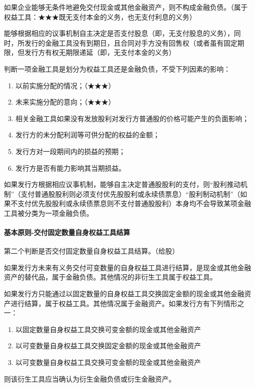 \documentclass[UTF8,12pt]{ctexart}
\numberwithin{equation}{section} %
\numberwithin{figure}{section}
\numberwithin{table}{section}
\begin{document}
	如果企业能够无条件地避免交付现金或其他金融资产，则不构成金融负债。（属于权益工具：★★★既无支付本金的义务，也无支付利息的义务）
	
	能够根据相应的议事机制自主决定是否支付股息（即，无支付股息的义务），同时，所发行的金融工具没有到期日，且合同对手方没有回售权（或者虽有固定期限，但发行方有权无期限递延（即，无支付本金的义务）
	
	判断一项金融工具是划分为权益工具还是金融负债，不受下列因素的影响：
	\begin{enumerate}
		\item 以前实施分配的情况；（★★★）
		
		\item 未来实施分配的意向；（★★★）
		
		\item 相关金融工具如果没有发放股利对发行方普通股的价格可能产生的负面影响；
		
		\item 发行方的未分配利润等可供分配的权益的金额；
		
		\item 发行方对一段期间内的损益的预期；
		
		\item 发行方是否有能力影响其当期损益。
	\end{enumerate}
	
	如果发行方根据相应议事机制，能够自主决定普通股股利的支付，则“股利推动机制”（支付普通股股利则必须支付优先股股利或永续债票息）“股利制动机制”（如果不支付优先股股利或永续债票息则不支付普通股股利）本身均不会导致某项金融工具被分类为一项金融负债。
	
	\paragraph{基本原则-交付固定数量自身权益工具结算}
	第二个判断是否交付固定数量自身权益工具结算。（给股）
	
	如果发行方未来有义务交付可变数量的自身权益工具进行结算，是现金或其他金融资产的替代品，属于金融负债。其他情况的非衍生工具属于权益工具。
	
	如果发行方只能通过以固定数量的自身权益工具交换固定金额的现金或其他金融资产进行结算，属于权益工具。其他情况属于金融资产。如果发行方有下列情形之一：
	\begin{enumerate}
		\item 以固定数量自身权益工具交换可变金额的现金或其他金融资产
		
		\item 以可变数量自身权益工具交换固定金额的现金或其他金融资产
		
		\item 以可变数量自身权益工具交换可变金额的现金或其他金融资产
	\end{enumerate}
	则该衍生工具应当确认为衍生金融负债或衍生金融资产。
	
\end{document}

